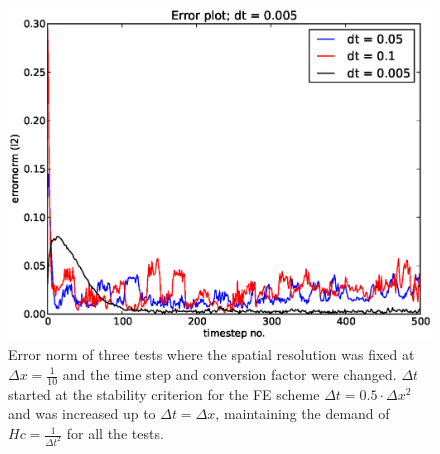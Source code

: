 \begin{figure}[H]
\centering
\includegraphics[scale=0.7]{Figures/errorplot_timestep_test.eps}
\caption[Effect of increasing time step]{Error norm of three tests where the spatial resolution was fixed at $\Delta x = \frac{1}{10}$ and the time step and conversion factor were changed. $\Delta t$ started at the stability criterion for the FE scheme $\Delta t = 0.5\cdot\Delta x^2$ and was increased up to $\Delta t = \Delta x$, maintaining the demand of $Hc = \frac{1}{\Delta t^2}$ for all the tests. }
\label{testing_dt_size}
\end{figure}
% 
